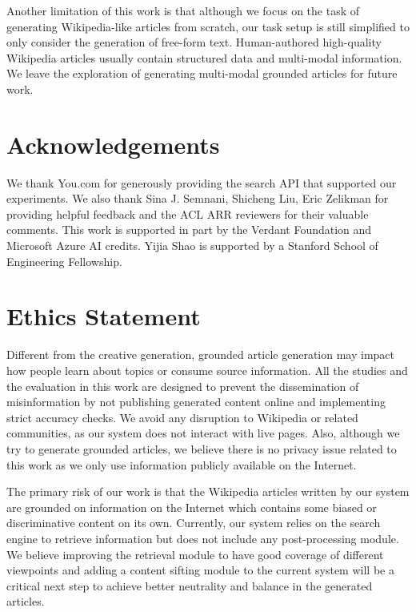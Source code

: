 \documentclass[11pt]{article}
\begin{document}
Another limitation of this work is that although we focus on the task of generating Wikipedia-like articles from scratch, our task setup is still simplified to only consider the generation of free-form text. Human-authored high-quality Wikipedia articles usually contain structured data and multi-modal information. We leave the exploration of generating multi-modal grounded articles for future work.



\section*{Acknowledgements}
We thank You.com for generously providing the search API that supported our experiments. We also thank Sina J. Semnani, Shicheng Liu, Eric Zelikman for providing helpful feedback and the ACL ARR reviewers for their valuable comments. This work is supported in part by the Verdant Foundation and Microsoft Azure AI credits. Yijia Shao is supported by a Stanford School of Engineering Fellowship.

\section*{Ethics Statement}

Different from the creative generation, grounded article generation may impact how people learn about topics or consume source information. All the studies and the evaluation in this work are designed to prevent the dissemination of misinformation by not publishing generated content online and implementing strict accuracy checks. We avoid any disruption to Wikipedia or related communities, as our system does not interact with live pages. Also, although we try to generate grounded articles, we believe there is no privacy issue related to this work as we only use information publicly available on the Internet.

The primary risk of our work is that the Wikipedia articles written by our system are grounded on information on the Internet which contains some biased or discriminative content on its own. Currently, our system relies on the search engine to retrieve information but does not include any post-processing module. We believe improving the retrieval module to have good coverage of different viewpoints and adding a content sifting module to the current system will be a critical next step to achieve better neutrality and balance in the generated articles. %
\end{document}
